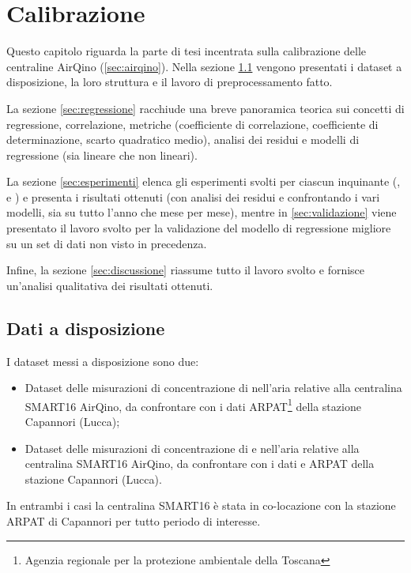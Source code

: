 \chapter{Calibrazione}\label{ch:calibrazione}
Questo capitolo riguarda la parte di tesi incentrata sulla calibrazione delle centraline AirQino (\ref{sec:airqino}). Nella sezione \ref{sec:dati} vengono presentati i dataset a disposizione, la loro struttura e il lavoro di preprocessamento fatto.

La sezione \ref{sec:regressione} racchiude una breve panoramica teorica sui concetti di regressione, correlazione, metriche (coefficiente di correlazione, coefficiente di determinazione, scarto quadratico medio), analisi dei residui e modelli di regressione (sia lineare che non lineari).

La sezione \ref{sec:esperimenti} elenca gli esperimenti svolti per ciascun inquinante (,  e ) e presenta i risultati ottenuti (con analisi dei residui e confrontando i vari modelli, sia su tutto l'anno che mese per mese), mentre in \ref{sec:validazione} viene presentato il lavoro svolto per la validazione del modello di regressione migliore su un set di dati non visto in precedenza.

Infine, la sezione \ref{sec:discussione} riassume tutto il lavoro svolto e fornisce un'analisi qualitativa dei risultati ottenuti.

\clearpage
\section{Dati a disposizione}\label{sec:dati}
I dataset messi a disposizione sono due:

\begin{itemize}
  \item Dataset delle misurazioni di concentrazione di  nell'aria relative alla centralina SMART16 AirQino, da confrontare con i dati  ARPAT\footnote{Agenzia regionale per la protezione ambientale della Toscana} della stazione Capannori (Lucca);
  \item Dataset delle misurazioni di concentrazione di  e  nell'aria relative alla centralina SMART16 AirQino, da confrontare con i dati  e  ARPAT della stazione Capannori (Lucca).
\end{itemize}

In entrambi i casi la centralina SMART16 è stata in co-locazione con la stazione ARPAT di Capannori per tutto periodo di interesse.\\

